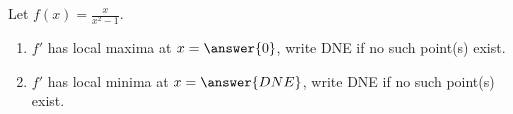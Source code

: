 \documentclass{ximera}
\author{Gregory Hartman \and Matthew Carr}
\begin{document}
\begin{exercise}






Let $f(x)=\frac{x}{x^2-1}$.
\begin{enumerate}
\item		$f'$ has local maxima at $x=\answer{0}$, write DNE if no such point(s) exist.
\item		$f'$ has local minima at $x=\answer{DNE}$, write DNE if no such point(s) exist.
\end{enumerate}

\end{exercise}
\end{document}
